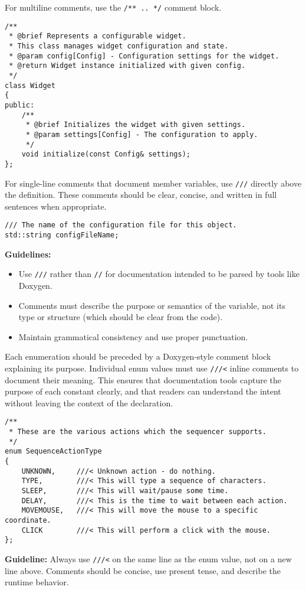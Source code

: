 For multiline comments, use the \texttt{/** .. */} comment block.
\begin{lstlisting}[style=cppstyle]
/**
 * @brief Represents a configurable widget.
 * This class manages widget configuration and state.
 * @param config[Config] - Configuration settings for the widget.
 * @return Widget instance initialized with given config.
 */
class Widget 
{
public:
    /**
     * @brief Initializes the widget with given settings.
     * @param settings[Config] - The configuration to apply.
     */
    void initialize(const Config& settings);
};
\end{lstlisting}
For single-line comments that document member variables, use \texttt{///} directly above the definition. These comments should be clear, concise, and written in full sentences when appropriate.
\begin{lstlisting}[style=cppstyle]
/// The name of the configuration file for this object.
std::string configFileName;
\end{lstlisting}
\textbf{Guidelines:}
\begin{itemize}
    \item Use \texttt{///} rather than \texttt{//} for documentation intended to be parsed by tools like Doxygen.
    \item Comments must describe the purpose or semantics of the variable, not its type or structure (which should be clear from the code).
    \item Maintain grammatical consistency and use proper punctuation.
\end{itemize}
Each enumeration should be preceded by a Doxygen-style comment block explaining its purpose. Individual enum values must use \texttt{///<} inline comments to document their meaning. This ensures that documentation tools capture the purpose of each constant clearly, and that readers can understand the intent without leaving the context of the declaration.
\begin{lstlisting}[style=cppstyle]
/**
 * These are the various actions which the sequencer supports.
 */
enum SequenceActionType
{
    UNKNOWN,     ///< Unknown action - do nothing.
    TYPE,        ///< This will type a sequence of characters.
    SLEEP,       ///< This will wait/pause some time.
    DELAY,       ///< This is the time to wait between each action.
    MOVEMOUSE,   ///< This will move the mouse to a specific coordinate.
    CLICK        ///< This will perform a click with the mouse.
};
\end{lstlisting}
\textbf{Guideline:} Always use \texttt{///<} on the same line as the enum value, not on a new line above. Comments should be concise, use present tense, and describe the runtime behavior.


